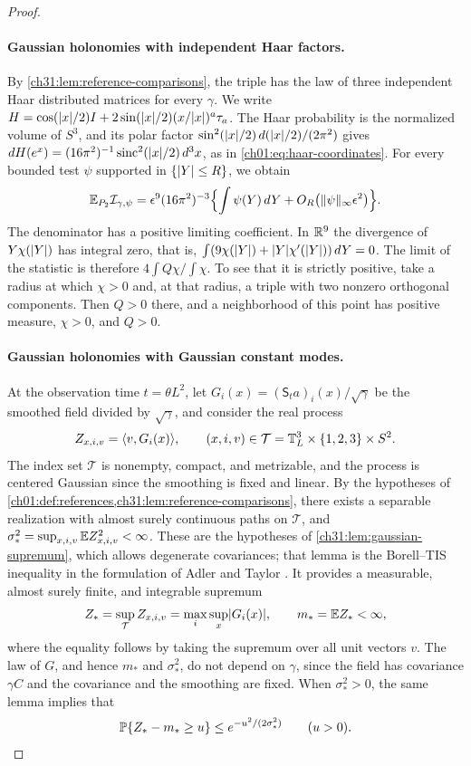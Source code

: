 \begin{proof}
\paragraph{Gaussian holonomies with independent Haar factors.}
By \cref{ch31:lem:reference-comparisons}, the triple has the law of three independent Haar distributed matrices for every $\gamma$. We write $H=\cos(\lvert x\rvert/2)I+2\sin(\lvert x\rvert/2)(x/\lvert x\rvert)^a\tau_a$. The Haar probability is the normalized volume of $S^3$, and its polar factor $\sin^2(\lvert x\rvert/2)\,d(\lvert x\rvert/2)/(2\pi^2)$ gives $dH(e^x)=(16\pi^2)^{-1}\operatorname{sinc}^2(\lvert x\rvert/2)\,d^3x$, as in \eqref{ch01:eq:haar-coordinates}. For every bounded test $\psi$ supported in $\{\lvert Y\rvert\le R\}$, we obtain
\[
 \mathbb E_{P_2}\mathcal I_{\gamma,\psi}=\epsilon^9(16\pi^2)^{-3}\Bigl\{\int\psi(Y)\,dY+O_R\bigl(\lVert \psi\rVert_\infty\epsilon^2\bigr)\Bigr\}.
\]
The denominator has a positive limiting coefficient. In $\mathbb R^9$ the divergence of $Y\chi(\lvert Y\rvert)$ has integral zero, that is, $\int(9\chi(\lvert Y\rvert)+\lvert Y\rvert\chi'(\lvert Y\rvert))\,dY=0$. The limit of the statistic is therefore $4\int Q\chi/\int\chi$. To see that it is strictly positive, take a radius at which $\chi>0$ and, at that radius, a triple with two nonzero orthogonal components. Then $Q>0$ there, and a neighborhood of this point has positive measure, $\chi>0$, and $Q>0$.

\paragraph{Gaussian holonomies with Gaussian constant modes.}
At the observation time $t=\theta L^2$, let $G_i(x)=(\mathsf S_ta)_i(x)/\sqrt\gamma$ be the smoothed field divided by $\sqrt\gamma$, and consider the real process
\[
 Z_{x,i,v}=\langle v,G_i(x)\rangle,\qquad(x,i,v)\in\mathcal T=\mathbb T_L^3\times\{1,2,3\}\times S^2.
\]
The index set $\mathcal T$ is nonempty, compact, and metrizable, and the process is centered Gaussian since the smoothing is fixed and linear. By the hypotheses of \cref{ch01:def:references,ch31:lem:reference-comparisons}, there exists a separable realization with almost surely continuous paths on $\mathcal T$, and $\sigma_*^2=\sup_{x,i,v}\mathbb E Z_{x,i,v}^2<\infty$. These are the hypotheses of \cref{ch31:lem:gaussian-supremum}, which allows degenerate covariances; that lemma is the Borell--TIS inequality in the formulation of Adler and Taylor \cite[Theorem~2.1.1]{AdlerTaylor2007}. It provides a measurable, almost surely finite, and integrable supremum
\[
 Z_*=\sup_{\mathcal T}Z_{x,i,v}=\max_i\sup_x\lvert G_i(x)\rvert,\qquad m_*=\mathbb E Z_*<\infty,
\]
where the equality follows by taking the supremum over all unit vectors $v$. The law of $G$, and hence $m_*$ and $\sigma_*^2$, do not depend on $\gamma$, since the field has covariance $\gamma C$ and the covariance and the smoothing are fixed. When $\sigma_*^2>0$, the same lemma implies that
\begin{equation}\label{ch32:eq:gaussian-supremum}
 \mathbb P\{Z_*-m_*\ge u\}\le e^{-u^2/(2\sigma_*^2)}\qquad(u>0).
\end{equation}


\end{proof}
